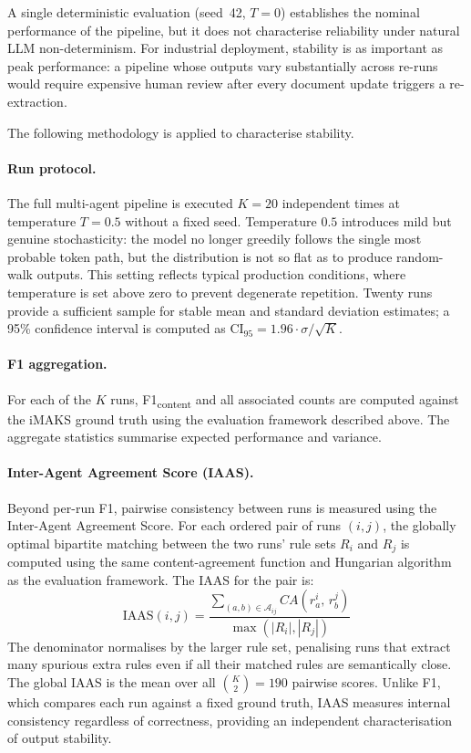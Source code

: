 ﻿\documentclass[11pt]{article}
\begin{document}
A single deterministic evaluation (seed~42, $T=0$) establishes the nominal
performance of the pipeline, but it does not characterise reliability under
natural LLM non-determinism.
For industrial deployment, stability is as important as peak performance: a
pipeline whose outputs vary substantially across re-runs would require expensive
human review after every document update triggers a re-extraction.

The following methodology is applied to characterise stability.

\paragraph{Run protocol.}
The full multi-agent pipeline is executed $K = 20$ independent times at
temperature $T = 0.5$ without a fixed seed.
Temperature $0.5$ introduces mild but genuine stochasticity: the model no longer
greedily follows the single most probable token path, but the distribution is
not so flat as to produce random-walk outputs.
This setting reflects typical production conditions, where temperature is set
above zero to prevent degenerate repetition.
Twenty runs provide a sufficient sample for stable mean and standard deviation
estimates; a 95\% confidence interval is computed as
$\text{CI}_{95} = 1.96 \cdot \sigma / \sqrt{K}$.

\paragraph{F1 aggregation.}
For each of the $K$ runs, F1\textsubscript{content} and all associated counts
are computed against the iMAKS ground truth using the evaluation framework
described above.
The aggregate statistics summarise expected performance and variance.

\paragraph{Inter-Agent Agreement Score (IAAS).}
Beyond per-run F1, pairwise consistency between runs is measured using the
Inter-Agent Agreement Score.
For each ordered pair of runs $(i,j)$, the globally optimal bipartite matching
between the two runs' rule sets $R_i$ and $R_j$ is computed using the same
content-agreement function and Hungarian algorithm as the evaluation framework.
The IAAS for the pair is:
\begin{equation}
\text{IAAS}(i,j) = \frac{\displaystyle\sum_{(a,b)\in\mathcal{A}_{ij}}
                         CA(r^i_a,\, r^j_b)}
                        {\max(|R_i|, |R_j|)}
\label{eq:iaas}
\end{equation}
The denominator normalises by the larger rule set, penalising runs that extract
many spurious extra rules even if all their matched rules are semantically close.
The global IAAS is the mean over all $\binom{K}{2} = 190$ pairwise scores.
Unlike F1, which compares each run against a fixed ground truth, IAAS measures
internal consistency regardless of correctness, providing an independent
characterisation of output stability.
\end{document}
